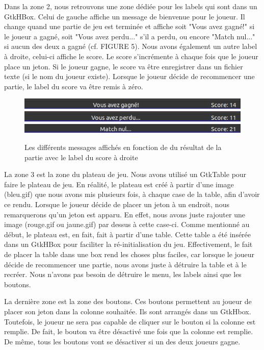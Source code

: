 \documentclass[a4paper, 11pt, oneside]{article}
\begin{document}
Dans la zone 2, nous retrouvons une zone dédiée pour les labels qui sont dans un GtkHBox. Celui de gauche affiche un message de bienvenue pour le joueur. Il change quand une partie de jeu est terminée et affiche soit "Vous avez gagné!" si le joueur a gagné, soit "Vous avez perdu..." s'il a perdu, ou encore "Match nul..." si aucun des deux a gagné (cf. FIGURE 5). Nous avons également un autre label à droite, celui-ci affiche le score. Le score s'incrémente à chaque fois que le joueur place un jeton. Si le joueur gagne, le score va être enregistrer dans un fichier texte (si le nom du joueur existe). Lorsque le joueur décide de recommencer une partie, le label du score va être remis à zéro. 

\begin{figure}[!h]
    \center
    \includegraphics[scale = 0.5]{image7.png}
    \includegraphics[scale = 0.5]{image8.png}
    \includegraphics[scale = 0.5]{image9.png}
    \caption{Les différents messages affichés en fonction de du résultat de la partie avec le label du score à droite }
\end{figure}

La zone 3 est la zone du plateau de jeu. Nous avons utilisé un GtkTable pour faire le plateau de jeu. En réalité, le plateau est créé à partir d'une image (bleu.gif) que nous avons mis plusieurs fois, à chaque case de la table, afin d'avoir ce rendu. Lorsque le joueur décide de placer un jeton à un endroit, nous remarquerons qu'un jeton est apparu. En effet, nous avons juste rajouter une image (rouge.gif ou jaune.gif) par dessus à cette case-ci. Comme mentionné au début, le plateau est, en fait, fait à partir d'une table. Cette table a été insérée dans un GtkHBox pour faciliter la ré-initialisation du jeu. Effectivement, le fait de placer la table dans une box rend les choses plus faciles, car lorsque le joueur décide de recommencer une partie, nous avons juste à détruire la table et à le recréer. Nous n'avons pas besoin de détruire le menu, les labels ainsi que les boutons.

La dernière zone est la zone des boutons. Ces boutons permettent au joueur de placer son jeton dans la colonne souhaitée. Ils sont arrangés dans un GtkHbox. Toutefois, le joueur ne sera pas capable de cliquer sur le bouton si la colonne est remplie. De fait, le bouton va être désactivé une fois que la colonne est remplie. De même, tous les boutons vont se désactiver si un des deux joueurs gagne.
\end{document}
